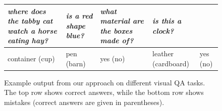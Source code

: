 \begin{figure}
\begin{tabular}{>{\raggedright}*{5}{p{.17\textwidth}}}
    \emph{where does the tabby cat watch a horse eating hay?} &
    \emph{is a red shape blue?} &
    \emph{what material are the boxes made of?} &
    \emph{is this a clock?} \\
    \midrule
    container (cup) &
    pen (barn) &
    yes (no) & 
    leather (cardboard) &
    yes (no) \\
    \bottomrule
  \end{tabular}
  \caption{Example output from our approach on different visual QA tasks. The
  top row shows correct answers, while the bottom row shows mistakes (correct
  answers are given in parentheses).}
  \label{fig:examples}
\end{figure}

%

